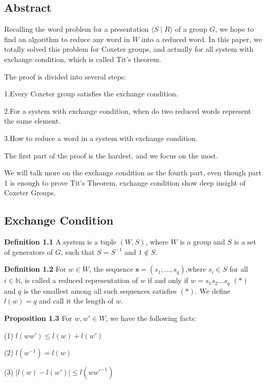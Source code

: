 \subsection{Abstract}

Recalling the word problem for a presentation $\langle S\mid R\rangle$ of a group $G$, we hope to find an algorithm to reduce any word in $W$ into a reduced word. In this paper, we totally solved this problem for Coxeter groups, and actually for all system with exchange condition, which is called Tit's theorem.

\noindent The proof is divided into several steps:

1.Every Coxeter group satisfies the exchange condition.

2.For a system with exchange condition, when do two reduced words represent the same element.

3.How to reduce a word in a system with exchange condition.

The first part of the proof is the hardest, and we focus on the most.

We will talk more on the exchange condition as the fourth part, even though part 1 is enough to prove Tit's Theorem, exchange condition show deep insight of Coxeter Groups.

\subsection{Exchange Condition}
\noindent \textbf{Definition 1.1}
    A system is a tuple $(W,S)$, where $W$ is a group and $S$ is a set of generators of $G$, such that $S=S^{-1}$ and $1\notin S$.

\vspace{\baselineskip}

\noindent \textbf{Definition 1.2}
    For $w \in W$, the sequence $\mathbf{s}=(s_1,...,s_q)$,where $s_i \in S$ for all $i\in \mathbb{N}$, is called a reduced representation of $w$ if and only if $w=s_1s_2...s_q$ $(*)$ and $q$ is the smallest among all such sequences satisfies $(*)$. We define $l(w)=q$ and call it the length of $w$.

\vspace{\baselineskip}

\noindent \textbf{Proposition 1.3}
    For $w,w'\in W$, we have the following facts:

\indent (1) $l(ww')\le l(w)+l(w')$

\indent (2) $l(w^{-1}) = l(w)$

\indent (3) $|l(w)-l(w')| \le l(ww'^{-1})$

